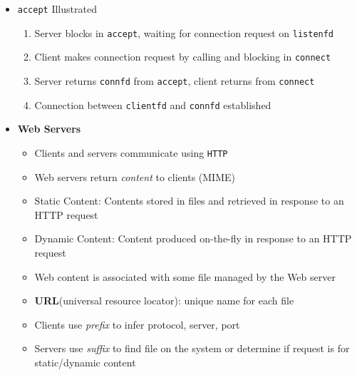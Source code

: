 \documentclass[12pt]{article}
\begin{document}
{\begin{itemize}
	\begin{itemize}
		\item \texttt{open\_clientfd}
		\begin{itemize}
			\item \texttt{int open\_clientfd(char *hostname, char *port);}
			\item Establish a connection with a server
		\end{itemize}
		\item \texttt{open\_listenfd}
		\begin{itemize}
			\item \texttt{int open\_listenfd(char *port);}
			\item Server creates listening descriptor that is ready to receive connection requests
		\end{itemize}
	\end{itemize}
	\item \texttt{accept} Illustrated
	\begin{enumerate}
		\item Server blocks in \texttt{accept}, waiting for connection request on \texttt{listenfd}
		\item Client makes connection request by calling and blocking in \texttt{connect}
		\item Server returns \texttt{connfd} from \texttt{accept}, client returns from \texttt{connect}
		\item Connection between \texttt{clientfd} and \texttt{connfd} established
	\end{enumerate}
	\item \textbf{Web Servers}
	\begin{itemize}
		\item Clients and servers communicate using \texttt{HTTP}
		\item Web servers return \textit{content} to clients (MIME)
		\item Static Content: Contents stored in files and retrieved in response to an HTTP request
		\item Dynamic Content: Content produced on-the-fly in response to an HTTP request
		\item Web content is associated with some file managed by the Web server
		\item \textbf{URL}(universal resource locator): unique name for each file
		\item Clients use \textit{prefix} to infer protocol, server, port
		\item Servers use \textit{suffix} to find file on the system or determine if request is for static/dynamic content

\end{itemize}
\end{itemize}}
\end{document}
